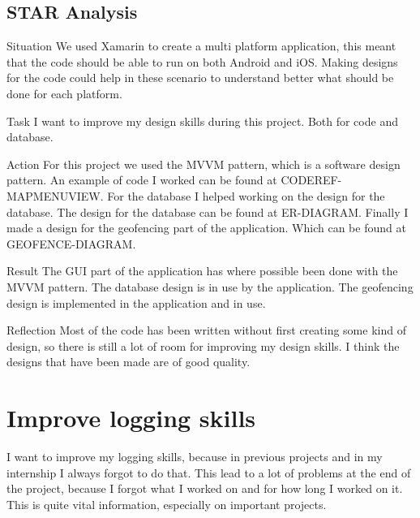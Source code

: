 \documentclass[12pt]{article}
\begin{document}
	\subsection{STAR Analysis}
	\begin{STAR}
	    \item[Situation] We used Xamarin to create a multi platform application, this meant that the code should be able to run on both Android and iOS. Making designs for the code could help in these scenario to understand better what should be done for each platform.
	    \item[Task] I want to improve my design skills during this project. Both for code and database.
	    \item[Action] For this project we used the MVVM pattern, which is a software design pattern. An example of code I worked can be found at CODEREF-MAPMENUVIEW. For the database I helped working on the design for the database. The design for the database can be found at ER-DIAGRAM. Finally I made a design for the geofencing part of the application. Which can be found at GEOFENCE-DIAGRAM.
	    \item[Result] The GUI part of the application has where possible been done with the MVVM pattern. The database design is in use by the application. The geofencing design is implemented in the application and in use.
	    \item[Reflection] Most of the code has been written without first creating some kind of design, so there is still a lot of room for improving my design skills. I think the designs that have been made are of good quality.
	\end{STAR}
	
	\clearpage
	\section{Improve logging skills}
	
	I want to improve my logging skills, because in previous projects and in my internship I always forgot to do that. This lead to a lot of problems at the end of the project, because I forgot what I worked on and for how long I worked on it. This is quite vital information, especially on important projects.
	
\end{document}
